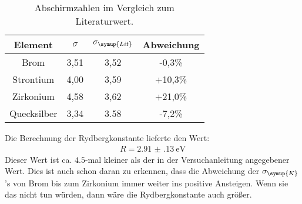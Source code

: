 \begin{table}[H]
  \centering
  \caption{Abschirmzahlen im Vergleich zum Literaturwert.}
    \begin{tabular}{c c c c}
    \toprule
    Element & $\sigma$ & $\sigma_\symup{Lit}$ & Abweichung\\
    \midrule
    Brom & 3,51 & 3,52 & -0,3\% \\
    Strontium & 4,00 & 3,59 & +10,3\% \\
    Zirkonium & 4,58 & 3,62 & +21,0\% \\
    Quecksilber & 3,34 & 3.58 & -7,2\% \\
    \bottomrule
  \end{tabular}
  \label{tab:sigma_lit}
\end{table}

Die Berechnung der Rydbergkonstante lieferte den Wert:
\begin{align*}
  R = \SI{2.91(13)}{\eV}
\end{align*}
Dieser Wert ist ca. $\num{4.5}$-mal kleiner als der in der Versuchanleitung angegebener
Wert. Dies ist auch schon daran zu erkennen, dass die Abweichung der $\sigma_\symup{K}$'s
von Brom bis zum Zirkonium immer weiter ins positive Ansteigen. Wenn sie das nicht tun
würden, dann wäre die Rydbergkonstante auch größer.
\nocite{sample}
\nocite{alpha}
